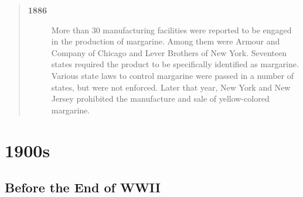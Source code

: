 \documentclass[mnsc,blindrev]{informs3} %
\begin{document}
\begin{quotation}
\begin{description}
\item[\bf 1886] More than 30 manufacturing facilities were reported to
be engaged in the production of margarine. Among them were Armour
and Company of Chicago and Lever Brothers of New York. Seventeen
states required the product to be specifically identified as
margarine. Various state laws to control margarine were passed in a
number of states, but were not enforced. Later that year, New York
and New Jersey prohibited the manufacture and sale of yellow-colored
margarine.

\end{description}

\end{quotation}



\section{1900s}

\subsection{Before the End of WWII}
\end{document}
